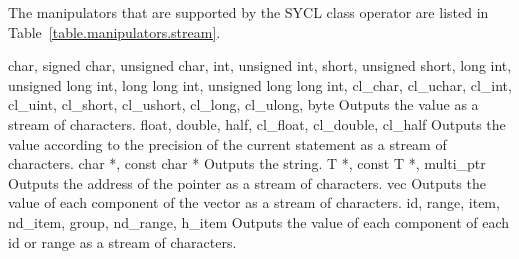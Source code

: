 The manipulators that are supported by the SYCL  class  operator are listed in Table~\ref{table.manipulators.stream}.


\addRow
{
  char, signed char, unsigned char, int, unsigned int, short, unsigned short, long int, unsigned long int, long long int, unsigned long long int, cl_char, cl_uchar, cl_int, cl_uint, cl_short, cl_ushort, cl_long, cl_ulong, byte
}
{
  Outputs the value as a stream of characters.
}
\addRow
{
  float, double, half, cl_float, cl_double, cl_half
}
{
  Outputs the value according to the precision of the current statement as a stream of characters.
}
\addRow
{
  char *, const char *
}
{
  Outputs the string.
}
\addRow
{
  T *, const T *, multi_ptr
}
{
  Outputs the address of the pointer as a stream of characters.
}
\addRow
{
  vec
}
{
  Outputs the value of each component of the vector as a stream of characters.
}
\addRow
{
  id, range, item, nd_item, group, nd_range, h_item
}
{
  Outputs the value of each component of each id or range as a stream of characters.
}
\completeTable


